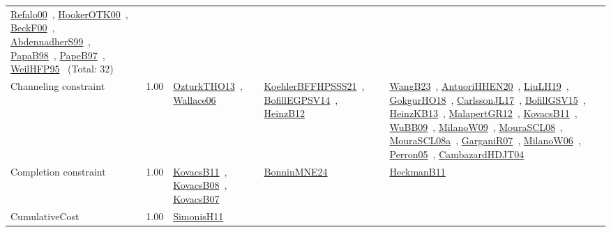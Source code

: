 {\begin{longtable}{p{3cm}r>{\raggedright\arraybackslash}p{6cm}>{\raggedright\arraybackslash}p{6cm}>{\raggedright\arraybackslash}p{8cm}}
\href{../works/Refalo00.pdf}{Refalo00}~\cite{Refalo00}, \href{../works/HookerOTK00.pdf}{HookerOTK00}~\cite{HookerOTK00}, \href{../works/BeckF00.pdf}{BeckF00}~\cite{BeckF00}, \href{../works/AbdennadherS99.pdf}{AbdennadherS99}~\cite{AbdennadherS99}, \href{../works/PapaB98.pdf}{PapaB98}~\cite{PapaB98}, \href{../works/PapeB97.pdf}{PapeB97}~\cite{PapeB97}, \href{../works/WeilHFP95.pdf}{WeilHFP95}~\cite{WeilHFP95} (Total: 32)\\
\index{Channeling constraint}\index{Constraints!Channeling constraint}Channeling constraint &  1.00 & \href{../works/OzturkTHO13.pdf}{OzturkTHO13}~\cite{OzturkTHO13}, \href{../works/Wallace06.pdf}{Wallace06}~\cite{Wallace06} & \href{../works/KoehlerBFFHPSSS21.pdf}{KoehlerBFFHPSSS21}~\cite{KoehlerBFFHPSSS21}, \href{../works/BofillEGPSV14.pdf}{BofillEGPSV14}~\cite{BofillEGPSV14}, \href{../works/HeinzB12.pdf}{HeinzB12}~\cite{HeinzB12} & \href{../works/WangB23.pdf}{WangB23}~\cite{WangB23}, \href{../works/AntuoriHHEN20.pdf}{AntuoriHHEN20}~\cite{AntuoriHHEN20}, \href{../works/LiuLH19.pdf}{LiuLH19}~\cite{LiuLH19}, \href{../works/GokgurHO18.pdf}{GokgurHO18}~\cite{GokgurHO18}, \href{../works/CarlssonJL17.pdf}{CarlssonJL17}~\cite{CarlssonJL17}, \href{../works/BofillGSV15.pdf}{BofillGSV15}~\cite{BofillGSV15}, \href{../works/HeinzKB13.pdf}{HeinzKB13}~\cite{HeinzKB13}, \href{../works/MalapertGR12.pdf}{MalapertGR12}~\cite{MalapertGR12}, \href{../works/KovacsB11.pdf}{KovacsB11}~\cite{KovacsB11}, \href{../works/WuBB09.pdf}{WuBB09}~\cite{WuBB09}, \href{../works/MilanoW09.pdf}{MilanoW09}~\cite{MilanoW09}, \href{../works/MouraSCL08.pdf}{MouraSCL08}~\cite{MouraSCL08}, \href{../works/MouraSCL08a.pdf}{MouraSCL08a}~\cite{MouraSCL08a}, \href{../works/GarganiR07.pdf}{GarganiR07}~\cite{GarganiR07}, \href{../works/MilanoW06.pdf}{MilanoW06}~\cite{MilanoW06}, \href{../works/Perron05.pdf}{Perron05}~\cite{Perron05}, \href{../works/CambazardHDJT04.pdf}{CambazardHDJT04}~\cite{CambazardHDJT04}\\
\index{Completion constraint}\index{Constraints!Completion constraint}Completion constraint &  1.00 & \href{../works/KovacsB11.pdf}{KovacsB11}~\cite{KovacsB11}, \href{../works/KovacsB08.pdf}{KovacsB08}~\cite{KovacsB08}, \href{../works/KovacsB07.pdf}{KovacsB07}~\cite{KovacsB07} & \href{../works/BonninMNE24.pdf}{BonninMNE24}~\cite{BonninMNE24} & \href{../works/HeckmanB11.pdf}{HeckmanB11}~\cite{HeckmanB11}\\
\index{CumulativeCost}\index{Constraints!CumulativeCost}CumulativeCost &  1.00 & \href{../works/SimonisH11.pdf}{SimonisH11}~\cite{SimonisH11} &  & \\

\end{longtable}}

